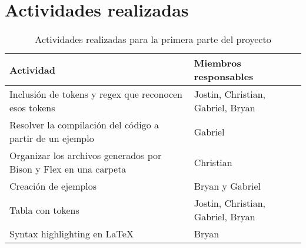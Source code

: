 \documentclass[titlepage]{article}
\begin{document}
\section{Actividades realizadas}
\begin{table}[H]
    \caption{Actividades realizadas para la primera parte del proyecto}
\begin{tabular}{ll}
    \toprule
    \textbf{Actividad} & \textbf{Miembros responsables} \\
    \midrule
        Inclusión de tokens y regex que reconocen esos tokens & Jostin, Christian, Gabriel, Bryan \\
        Resolver la compilación del código a partir de un ejemplo& Gabriel \\
        Organizar los archivos generados por Bison y Flex en una carpeta & Christian \\
        Creación de ejemplos & Bryan y Gabriel \\
        Tabla con tokens & Jostin, Christian, Gabriel, Bryan \\
        Syntax highlighting en \LaTeX & Bryan \\
    \bottomrule
\end{tabular}
\label{tab:actividades}
\end{table}
\end{document}
